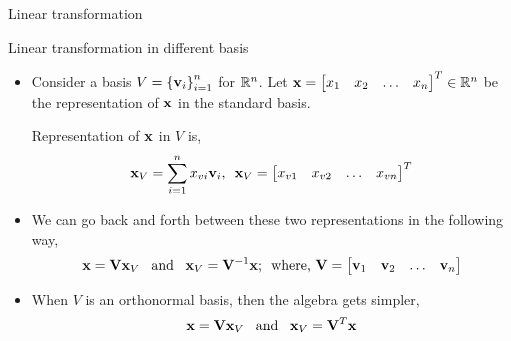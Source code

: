 \documentclass[aspectratio=169]{beamer}
\let\olditem\item
\renewcommand{\item}{\setlength{\itemsep}{\fill}\olditem}
\def\mf{\ensuremath\mathbf}
\def\mb{\ensuremath\mathbb}
\begin{document}
\begin{frame}[t]{Linear transformation}
\begin{center}
\end{center}

\end{frame}


\begin{frame}[t]{Linear transformation in different basis}
\begin{itemize}
    \item Consider a basis $V=\left\{\mf{v}_i\right\}_{i=1}^{n}$ for $\mb{R}^n$. Let $\mf{x} = \begin{bmatrix*}x_1 & x_2 & \ldots & x_n\end{bmatrix*}^T \in \mb{R}^n$ be the representation of $\mf{x}$ in 
    the standard basis.
    
    Representation of $\mf{x}$ in $V$ is,
    \[ \mf{x}_{V} = \sum_{i=1}^n x_{vi}\mf{v}_i, \,\,\, \mf{x}_V = \begin{bmatrix*}x_{v1} & x_{v2} & \ldots & x_{vn}\end{bmatrix*}^T \]

    \item We can go back and forth between these two representations in the following way,
    \[ \mf{x} = \mf{V}\mf{x}_V \,\,\, \text{ and } \,\,\, \mf{x}_V = \mf{V}^{-1}\mf{x}; \,\,\, \text{where, } \mf{V} = \begin{bmatrix*}\mf{v}_1 & \mf{v}_2 & \ldots & \mf{v}_n\end{bmatrix*} \]

    \item When $V$ is an orthonormal basis, then the algebra gets simpler,
    \[ \mf{x} = \mf{V}\mf{x}_V \,\,\, \text{ and } \,\,\, \mf{x}_V = \mf{V}^T\mf{x} \]

\end{itemize}
\end{frame}
\end{document}
